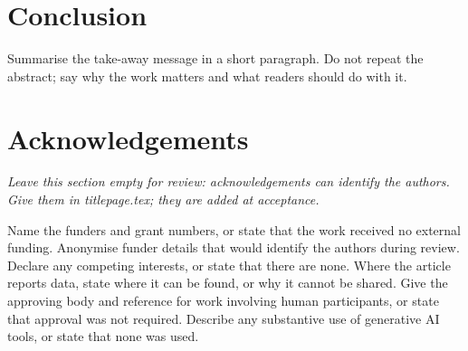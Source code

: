 \documentclass[magazine,anonymous,lineno,{{CITEOPT}}]{nextgeniq}
\begin{document}
\section{Conclusion}

Summarise the take-away message in a short paragraph. Do not repeat the
abstract; say why the work matters and what readers should do with it.

\section*{Acknowledgements}

\textit{Leave this section empty for review: acknowledgements can identify the
authors. Give them in titlepage.tex; they are added at acceptance.}

\begin{declarations}
   Name the funders and grant numbers, or state that the
  work received no external funding. Anonymise funder details that would
  identify the authors during review.
   Declare any competing interests, or
  state that there are none.
   Where the article reports data, state where
  it can be found, or why it cannot be shared.
   Give the approving body and reference for
  work involving human participants, or state that approval was not
  required.
   Describe any substantive use of
  generative AI tools, or state that none was used.
\end{declarations}


\end{document}
